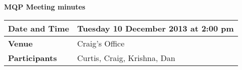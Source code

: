 \documentclass[a4wide,10pt]{extarticle}
\begin{document}
\thispagestyle{empty}

\begin{center}
\textbf{MQP Meeting minutes}
\vspace{0.33cm}
\end{center}

\begin{center}
\begin{tabular}{| m{2.8cm} | m{13.6cm} |} \hline
\textbf{Date and Time} & Tuesday 10 December 2013 at 2:00 pm \\ \hline
\textbf{Venue} & Craig's Office \\ \hline
\textbf{Participants} & Curtis, Craig, Krishna, Dan\\ \hline
\end{tabular}
\end{center}
\end{document}
